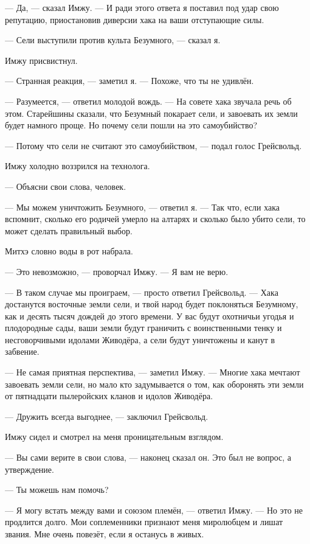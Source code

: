 --- Да, --- сказал Имжу.
--- И ради этого ответа я поставил под удар свою репутацию, приостановив диверсии хака на ваши отступающие силы.

--- Сели выступили против культа Безумного, --- сказал я.

Имжу присвистнул.

--- Странная реакция, --- заметил я.
--- Похоже, что ты не удивлён.

--- Разумеется, --- ответил молодой вождь.
--- На совете хака звучала речь об этом.
Старейшины сказали, что Безумный покарает сели, и завоевать их земли будет намного проще.
Но почему сели пошли на это самоубийство?

--- Потому что сели не считают это самоубийством, --- подал голос Грейсвольд.

Имжу холодно воззрился на технолога.

--- Объясни свои слова, человек.

--- Мы можем уничтожить Безумного, --- ответил я.
--- Так что, если хака вспомнит, сколько его родичей умерло на алтарях и сколько было убито сели, то может сделать правильный выбор.

Митхэ словно воды в рот набрала.

--- Это невозможно, --- проворчал Имжу.
--- Я вам не верю.

--- В таком случае мы проиграем, --- просто ответил Грейсвольд.
--- Хака достанутся восточные земли сели, и твой народ будет поклоняться Безумному, как и десять тысяч дождей до этого времени.
У вас будут охотничьи угодья и плодородные сады, ваши земли будут граничить с воинственными тенку и несговорчивыми идолами Живодёра, а сели будут уничтожены и канут в забвение.

--- Не самая приятная перспектива, --- заметил Имжу.
--- Многие хака мечтают завоевать земли сели, но мало кто задумывается о том, как оборонять эти земли от пятнадцати пылеройских кланов и идолов Живодёра.

--- Дружить всегда выгоднее, --- заключил Грейсвольд.

Имжу сидел и смотрел на меня проницательным взглядом.

--- Вы сами верите в свои слова, --- наконец сказал он.
Это был не вопрос, а утверждение.

--- Ты можешь нам помочь?

--- Я могу встать между вами и союзом племён, --- ответил Имжу.
--- Но это не продлится долго.
Мои соплеменники признают меня миролюбцем и лишат звания.
Мне очень повезёт, если я останусь в живых.

